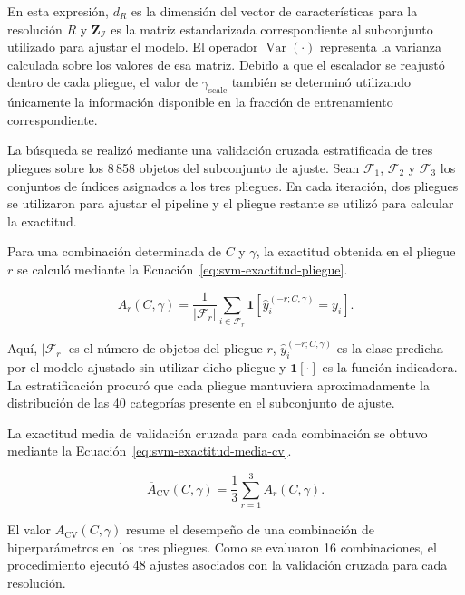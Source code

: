 En esta expresión, $d_R$ es la dimensión del vector de características para la resolución $R$ y $\mathbf Z_{\mathcal I}$ es la matriz estandarizada correspondiente al subconjunto utilizado para ajustar el modelo. El operador $\operatorname{Var}(\cdot)$ representa la varianza calculada sobre los valores de esa matriz. Debido a que el escalador se reajustó dentro de cada pliegue, el valor de $\gamma_{\mathrm{scale}}$ también se determinó utilizando únicamente la información disponible en la fracción de entrenamiento correspondiente.

La búsqueda se realizó mediante una validación cruzada estratificada de tres pliegues sobre los 8\,858 objetos del subconjunto de ajuste. Sean $\mathcal F_1$, $\mathcal F_2$ y $\mathcal F_3$ los conjuntos de índices asignados a los tres pliegues. En cada iteración, dos pliegues se utilizaron para ajustar el pipeline y el pliegue restante se utilizó para calcular la exactitud.

Para una combinación determinada de $C$ y $\gamma$, la exactitud obtenida en el pliegue $r$ se calculó mediante la Ecuación~\eqref{eq:svm-exactitud-pliegue}.

\begin{equation}
A_r(C,\gamma)
=
\frac{1}{|\mathcal F_r|}
\sum_{i\in\mathcal F_r}
\mathbf 1
\left[
\widehat y_i^{(-r;C,\gamma)}=y_i
\right].
\label{eq:svm-exactitud-pliegue}
\end{equation}

Aquí, $|\mathcal F_r|$ es el número de objetos del pliegue $r$, $\widehat y_i^{(-r;C,\gamma)}$ es la clase predicha por el modelo ajustado sin utilizar dicho pliegue y $\mathbf 1[\cdot]$ es la función indicadora. La estratificación procuró que cada pliegue mantuviera aproximadamente la distribución de las 40 categorías presente en el subconjunto de ajuste.

La exactitud media de validación cruzada para cada combinación se obtuvo mediante la Ecuación~\eqref{eq:svm-exactitud-media-cv}.

\begin{equation}
\overline{A}_{\mathrm{CV}}(C,\gamma)
=
\frac{1}{3}
\sum_{r=1}^{3}
A_r(C,\gamma).
\label{eq:svm-exactitud-media-cv}
\end{equation}

El valor $\overline{A}_{\mathrm{CV}}(C,\gamma)$ resume el desempeño de una combinación de hiperparámetros en los tres pliegues. Como se evaluaron 16 combinaciones, el procedimiento ejecutó 48 ajustes asociados con la validación cruzada para cada resolución.

